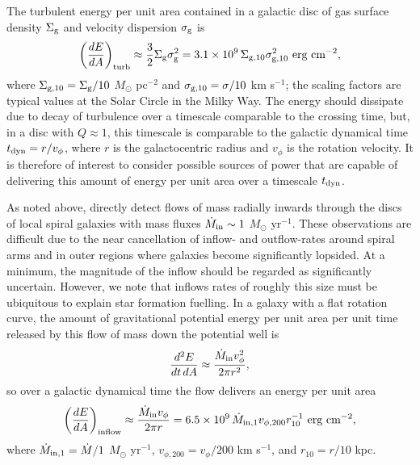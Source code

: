 \documentclass[useAMS,usenatbib]{mn2e}
\begin{document}
The turbulent energy per unit area contained in a galactic disc of gas surface density $\Sigma_{\rm g}$ and velocity dispersion $\sigma_{\rm g}$ is
\begin{equation}
\left(\frac{dE}{dA}\right)_{\rm turb} \approx \frac{3}{2}\Sigma_{\rm g} \sigma_{\rm g}^2 = 3.1\times 10^9\, \Sigma_{\rm g,10} \sigma_{\rm g,10}^2\mbox{ erg cm}^{-2},
\end{equation}
where $\Sigma_{\rm g,10} = \Sigma_{\rm g}/10$ $M_\odot$ pc$^{-2}$ and $\sigma_{\rm g,10} = \sigma/10$ km s$^{-1}$; the scaling factors are typical values at the Solar Circle in the Milky Way. The energy should dissipate due to decay of turbulence over a timescale comparable to the crossing time, but, in a disc with $Q\approx 1$, this timescale is comparable to the galactic dynamical time $t_{\rm dyn} = r/v_\phi$, where $r$ is the galactocentric radius and $v_\phi$ is the rotation velocity. It is therefore of interest to consider possible sources of power that are capable of delivering this amount of energy per unit area over a timescale $t_{\rm dyn}$.

As noted above, \citet{schmidt16a} directly detect flows of mass radially inwards through the discs of local spiral galaxies with mass fluxes $\dot{M}_{\rm in} \sim 1$ $M_\odot$ yr$^{-1}$. These observations are difficult due to the near cancellation of inflow- and outflow-rates around spiral arms and in outer regions where galaxies become significantly lopsided. At a minimum, the magnitude of the inflow should be regarded as significantly uncertain. However, we note that inflows rates of roughly this size must be ubiquitous to explain star formation fuelling. In a galaxy with a flat rotation curve, the amount of gravitational potential energy per unit area per unit time released by this flow of mass down the potential well is
\begin{equation}
\frac{d^2 E}{dt\, dA} \approx \frac{\dot{M}_{\rm in} v_\phi^2}{2\pi r^2},
\end{equation}
so over a galactic dynamical time the flow delivers an energy per unit area
\begin{equation}
\left(\frac{dE}{dA}\right)_{\rm inflow} \approx \frac{\dot{M}_{\rm in} v_\phi}{2\pi r} = 6.5\times 10^9\, \dot{M}_{\rm in,1} v_{\phi,200} r_{10}^{-1}\mbox{ erg cm}^{-2},
\end{equation}
where $\dot{M}_{\rm in, 1} = \dot{M}/1$ $M_\odot$ yr$^{-1}$, $v_{\phi,200} = v_\phi/200$ km s$^{-1}$, and $r_{10} = r/10$ kpc.
\end{document}
